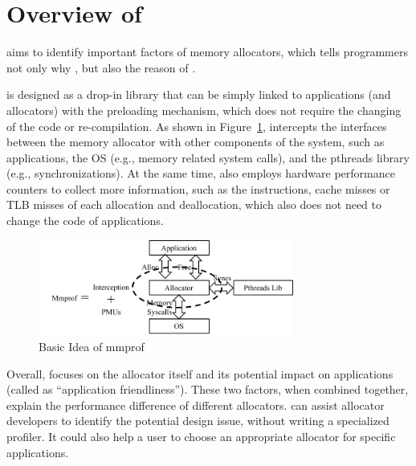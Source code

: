 \section{Overview of \MP{}}

\MP{} aims to identify important factors of memory allocators, which tells programmers not only why , but also the reason of . 

\MP{} is designed as a drop-in library that can be simply linked to applications (and allocators) with the preloading mechanism, which does not require the changing of the code or re-compilation. %
As shown in Figure~\ref{fig:basicidea}, \MP{} intercepts the interfaces between the memory allocator with other components of the system, such as applications, the OS (e.g.,  memory related system calls), and the pthreads library (e.g., synchronizations). At the same time, \MP{} also employs  hardware performance counters to collect more information, such as the instructions, cache misses or TLB misses of each allocation and deallocation, which also does not need to change the code of applications. 
 
\begin{figure}[!ht]
\centering
\includegraphics[width=3.3in]{figures/basicidea}
\caption{Basic Idea of mmprof\label{fig:basicidea}}
\end{figure}

Overall, \MP{} focuses on the allocator itself and its potential impact on applications (called as ``application friendliness''). These two factors, when combined together, explain the performance difference of different allocators. \MP{} can assist  allocator developers to identify the potential  design issue, without writing a specialized profiler. It could also help a user to choose an appropriate allocator for specific applications.

